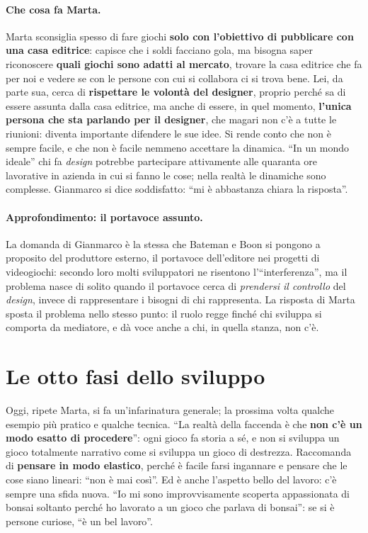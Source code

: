 \paragraph{Che cosa fa Marta.} Marta sconsiglia spesso di fare giochi \textbf{solo con
l'obiettivo di pubblicare con una casa editrice}: capisce che i soldi facciano gola, ma
bisogna saper riconoscere \textbf{quali giochi sono adatti al mercato}, trovare la casa
editrice che fa per noi e vedere se con le persone con cui si collabora ci si trova bene.
Lei, da parte sua, cerca di \textbf{rispettare le volontà del designer}, proprio perché sa
di essere assunta dalla casa editrice, ma anche di essere, in quel momento,
\textbf{l'unica persona che sta parlando per il designer}, che magari non c'è a tutte le
riunioni: diventa importante difendere le sue idee. Si rende conto che non è sempre
facile, e che non è facile nemmeno accettare la dinamica. ``In un mondo ideale'' chi fa
\emph{design} potrebbe partecipare attivamente alle quaranta ore lavorative in azienda in
cui si fanno le cose; nella realtà le dinamiche sono complesse. Gianmarco si dice
soddisfatto: ``mi è abbastanza chiara la risposta''.

\paragraph{Approfondimento: il portavoce assunto.} La domanda di Gianmarco è la stessa che
Bateman e Boon si pongono a proposito del produttore esterno, il portavoce dell'editore
nei progetti di videogiochi: secondo loro molti sviluppatori ne risentono
l'``interferenza'', ma il problema nasce di solito quando il portavoce cerca di
\emph{prendersi il controllo} del \emph{design}, invece di rappresentare i bisogni di chi
rappresenta. La risposta di Marta sposta il problema nello stesso punto: il ruolo regge
finché chi sviluppa si comporta da mediatore, e dà voce anche a chi, in quella stanza, non
c'è.

\section{Le otto fasi dello sviluppo}
\label{a13:sec:fasi}



Oggi, ripete Marta, si fa un'infarinatura generale; la prossima volta qualche esempio più
pratico e qualche tecnica. ``La realtà della faccenda è che \textbf{non c'è un modo esatto
di procedere}'': ogni gioco fa storia a sé, e non si sviluppa un gioco totalmente
narrativo come si sviluppa un gioco di destrezza. Raccomanda di \textbf{pensare in modo
elastico}, perché è facile farsi ingannare e pensare che le cose siano lineari: ``non è mai
così''. Ed è anche l'aspetto bello del lavoro: c'è sempre una sfida nuova. ``Io mi sono
improvvisamente scoperta appassionata di bonsai soltanto perché ho lavorato a un gioco che
parlava di bonsai'': se si è persone curiose, ``è un bel lavoro''.

